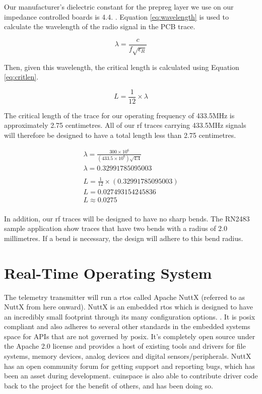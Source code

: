 Our manufacturer's dielectric constant for the prepreg layer we use on our impedance controlled boards is 4.4.
\cite{jlc-pcb-impedance}. Equation \ref{eq:wavelength} is used to calculate the wavelength of the radio signal in the
PCB trace.

\begin{equation}
    \lambda = \frac{c}{f\sqrt{\epsilon_R}}
\end{equation} \label{eq:wavelength}

Then, given this wavelength, the critical length is calculated using Equation \ref{eq:critlen}.

\begin{equation}
    L = \frac{1}{12} \times \lambda
\end{equation} \label{eq:critlen}

The critical length of the trace for our operating frequency of 433.5MHz is approximately 2.75 centimetres. All of our
\gls{rf} traces carrying 433.5MHz signals will therefore be designed to have a total length less than 2.75 centimetres.

\begin{gather*}
    \lambda = \frac{300 \times 10^6}{(433.5 \times 10^6)\sqrt{4.4}} \\
    \lambda = 0.32991785095003 \\
    \\
    L = \frac{1}{12} \times (0.32991785095003) \\
    L = 0.027493154245836 \\
    L \approx 0.0275 \\
\end{gather*}

In addition, our \gls{rf} traces will be designed to have no sharp bends. The RN2483 sample application show traces
that have two bends with a radius of 2.0 millimetres. \cite[Sec. 5.1]{rn2483-datasheet} If a bend is necessary, the
design will adhere to this bend radius.

\section{Real-Time Operating System}

The telemetry transmitter will run a \gls{rtos} called Apache NuttX (referred to as NuttX from here onward). NuttX is
an embedded \gls{rtos} which is designed to have an incredibly small footprint through its many configuration options.
\cite{nuttx-about}. It is \gls{posix} compliant and also adheres to several other standards in the embedded systems
space for APIs that are not governed by \gls{posix}. \cite{nuttx-about} It's completely open source under the Apache
2.0 license and provides a host of existing tools and drivers for file systems, memory devices, analog devices and
digital sensors/peripherals. NuttX has an open community forum for getting support and reporting bugs, which has been
an asset during development. \Gls{cuinspace} is also able to contribute driver code back to the project for the benefit
of others, and has been doing so.

